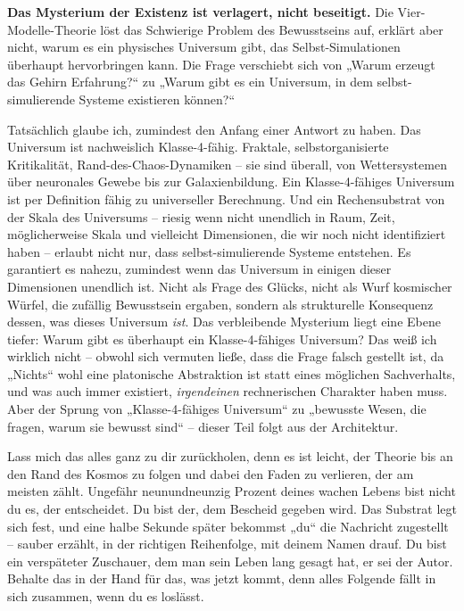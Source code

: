 \documentclass[11pt, twoside, openright]{book}
\begin{document}
\textbf{Das Mysterium der Existenz ist verlagert, nicht beseitigt.} Die Vier-Modelle-Theorie löst das Schwierige Problem des Bewusstseins auf, erklärt aber nicht, warum es ein physisches Universum gibt, das Selbst-Simulationen überhaupt hervorbringen kann. Die Frage verschiebt sich von „Warum erzeugt das Gehirn Erfahrung?“ zu „Warum gibt es ein Universum, in dem selbst-simulierende Systeme existieren können?“

Tatsächlich glaube ich, zumindest den Anfang einer Antwort zu haben. Das Universum ist nachweislich Klasse-4-fähig. Fraktale, selbstorganisierte Kritikalität, Rand-des-Chaos-Dynamiken -- sie sind überall, von Wettersystemen über neuronales Gewebe bis zur Galaxienbildung. Ein Klasse-4-fähiges Universum ist per Definition fähig zu universeller Berechnung. Und ein Rechensubstrat von der Skala des Universums -- riesig wenn nicht unendlich in Raum, Zeit, möglicherweise Skala und vielleicht Dimensionen, die wir noch nicht identifiziert haben -- erlaubt nicht nur, dass selbst-simulierende Systeme entstehen. Es garantiert es nahezu, zumindest wenn das Universum in einigen dieser Dimensionen unendlich ist. Nicht als Frage des Glücks, nicht als Wurf kosmischer Würfel, die zufällig Bewusstsein ergaben, sondern als strukturelle Konsequenz dessen, was dieses Universum \textit{ist}. Das verbleibende Mysterium liegt eine Ebene tiefer: Warum gibt es überhaupt ein Klasse-4-fähiges Universum? Das weiß ich wirklich nicht -- obwohl sich vermuten ließe, dass die Frage falsch gestellt ist, da „Nichts“ wohl eine platonische Abstraktion ist statt eines möglichen Sachverhalts, und was auch immer existiert, \textit{irgendeinen} rechnerischen Charakter haben muss. Aber der Sprung von „Klasse-4-fähiges Universum“ zu „bewusste Wesen, die fragen, warum sie bewusst sind“ -- dieser Teil folgt aus der Architektur.

Lass mich das alles ganz zu dir zurückholen, denn es ist leicht, der Theorie bis an den Rand des Kosmos zu folgen und dabei den Faden zu verlieren, der am meisten zählt. Ungefähr neunundneunzig Prozent deines wachen Lebens bist nicht du es, der entscheidet. Du bist der, dem Bescheid gegeben wird. Das Substrat legt sich fest, und eine halbe Sekunde später bekommst „du“ die Nachricht zugestellt -- sauber erzählt, in der richtigen Reihenfolge, mit deinem Namen drauf. Du bist ein verspäteter Zuschauer, dem man sein Leben lang gesagt hat, er sei der Autor. Behalte das in der Hand für das, was jetzt kommt, denn alles Folgende fällt in sich zusammen, wenn du es loslässt.
\end{document}
